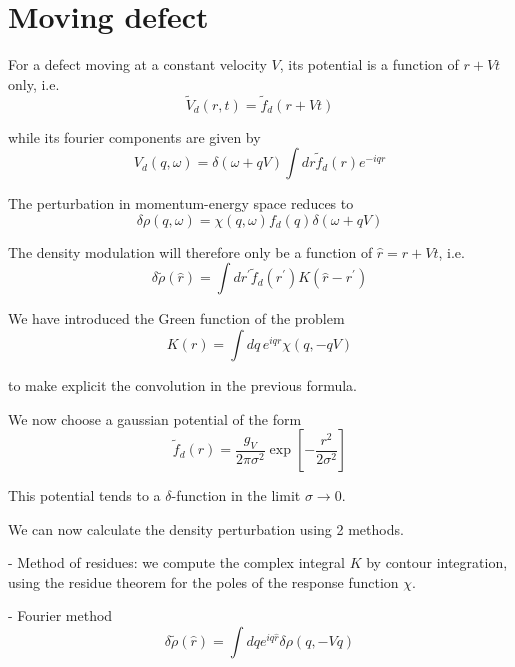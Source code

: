 \documentclass[a4paper,prb,10pt,aps,twocolumn]{revtex4-1}
\begin{document}
\section{Moving defect}


For a defect moving at a constant velocity $V$, its potential is a
function of $r + Vt$ only, i.e.
\begin{equation}
  \label{eq:50}
  \tilde{V}_{d}(r,t)=\tilde{f}_{d}(r+Vt)
\end{equation}


while its fourier components are given by
\begin{equation}
  \label{eq:51}
   V_{d}(q,\omega)=\delta\left(\omega+qV\right)\int dr\tilde{f}_{d}(r)e^{-iqr}
\end{equation}


The perturbation in momentum-energy space reduces to
\begin{equation}
  \label{eq:52}
   \delta\rho(q,\omega)=\chi(q,\omega)f_d(q)\delta\left(\omega+qV\right)
\end{equation}


The density modulation will therefore only be a function of
$\hat{r}=r+Vt$, i.e.
\begin{equation}
  \label{eq:53}
  \delta\tilde{\rho}(\hat{r})=\int dr^{\prime}\tilde{f}_{d}(r^{\prime})K(\hat{r}-r^{\prime})
\end{equation}


We have introduced the Green function of the problem
\begin{equation}
  \label{eq:54}
   K(r)=\int dq\, e^{iqr}\chi(q,-qV)
\end{equation}


to make explicit the convolution in the previous formula.

We now choose a gaussian potential of the form
\begin{equation}
  \label{eq:55}
   \tilde{f}_{d}(r)=\frac{g_{V}}{2\pi\sigma^{2}}\exp\left[-\frac{r^{2}}{2\sigma^{2}}\right]
\end{equation}


This potential tends to a $\delta$-function in the limit
$\sigma \rightarrow 0$.

We can now calculate the density perturbation using 2 methods.

-  Method of residues: we compute the complex integral $K$ by
   contour integration, using the residue theorem for the poles of the
   response function $\chi$.

-  Fourier method
\begin{equation}
  \label{eq:56}
\delta\tilde{\rho}(\hat{r})=\int dqe^{iq\hat{r}}\delta\rho(q,-Vq)  
\end{equation}
\end{document}
